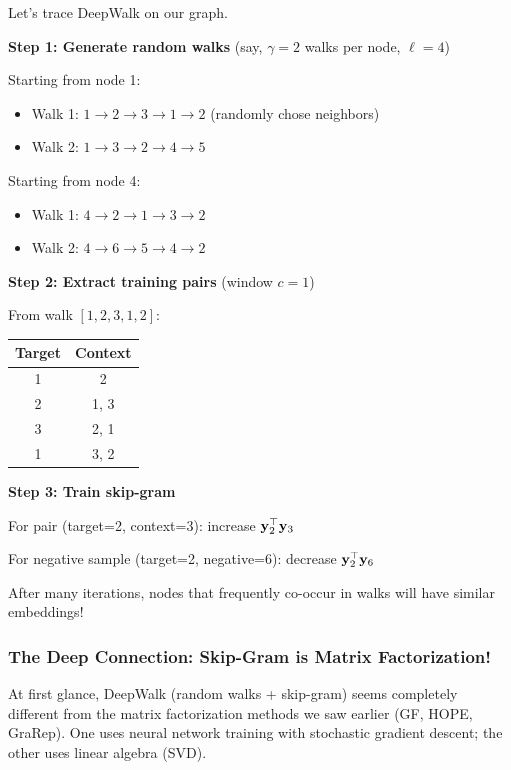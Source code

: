 \begin{notechapter}
\begin{example}
Let's trace DeepWalk on our graph.

\textbf{Step 1: Generate random walks} (say, $\gamma=2$ walks per node, $\ell=4$)

Starting from node 1:
\begin{itemize}
    \item Walk 1: $1 \to 2 \to 3 \to 1 \to 2$ (randomly chose neighbors)
    \item Walk 2: $1 \to 3 \to 2 \to 4 \to 5$
\end{itemize}

Starting from node 4:
\begin{itemize}
    \item Walk 1: $4 \to 2 \to 1 \to 3 \to 2$
    \item Walk 2: $4 \to 6 \to 5 \to 4 \to 2$
\end{itemize}

\textbf{Step 2: Extract training pairs} (window $c=1$)

From walk $[1, 2, 3, 1, 2]$:
\begin{center}
\begin{tabular}{cc}
\toprule
Target & Context \\
\midrule
1 & 2 \\
2 & 1, 3 \\
3 & 2, 1 \\
1 & 3, 2 \\
\bottomrule
\end{tabular}
\end{center}

\textbf{Step 3: Train skip-gram}

For pair (target=2, context=3): increase $\mathbf{y}_2^\top \mathbf{y}_3$

For negative sample (target=2, negative=6): decrease $\mathbf{y}_2^\top \mathbf{y}_6$

After many iterations, nodes that frequently co-occur in walks will have similar embeddings!
\end{example}

\subsubsection*{The Deep Connection: Skip-Gram is Matrix Factorization!}

At first glance, DeepWalk (random walks + skip-gram) seems completely different from the matrix factorization methods we saw earlier (GF, HOPE, GraRep). One uses neural network training with stochastic gradient descent; the other uses linear algebra (SVD).


\end{notechapter}
